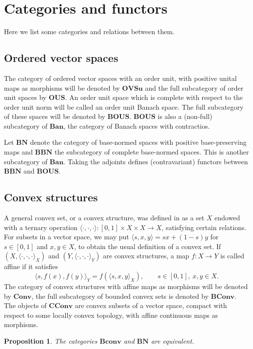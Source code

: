 \documentclass[12pt]{article}
\newtheorem{prop}{Proposition}
\newcommand{\<}{\langle}
\def\>{\rangle}
\newcommand{\ct}[1]{\mathbf{#1}}
\begin{document}
\section{Categories and functors}

Here we list some categories and relations between them. 

\subsection{Ordered vector spaces}

The category of ordered vector spaces with an order unit, with positive unital maps as morphisms will be denoted by $\ct{OVSu}$ and the full subcategory of order unit 
spaces by  $\ct{OUS}$. An order unit space which is complete with respect to the order unit norm will be called an order unit Banach space. The full subcategory of these spaces will be denoted by $\ct{BOUS}$. $\ct{BOUS}$ is also a (non-full) subcategory of $\ct{Ban}$, the category of Banach spaces with contractios.


Let $\ct{BN}$ denote the category of base-normed spaces with positive base-preserving maps and $\ct{BBN}$ the subcategory of complete base-normed spaces. 
 This is another subcategory of $\ct{Ban}$. Taking the adjoints defines  (contravariant) functors between  $\ct{BBN}$ and $\ct{BOUS}$. 

\subsection{Convex structures}

A general convex set, or a convex structure, was defined in \cite{gudder} as a set $X$ endowed with a ternary operation $\<\cdot,\cdot,\cdot\>: [0,1]\times X\times X\to X$,
 satisfying certain relations. For subsets in a vector space, we may put $\<s,x,y\>=sx+(1-s)y$ for $s\in [0,1]$ and $x,y\in X$, to obtain the usual definition of a convex set.  If $(X,\<\cdot,\cdot,\cdot\>_X)$ and $(Y,\<\cdot,\cdot,\cdot\>_Y)$ are convex structures, a map $f:X\to Y$ is called affine if it satisfies
\[
\<s,f(x),f(y)\>_Y=f(\<s,x,y\>_X),\qquad s\in [0,1],\ x,y\in X.
\]
The category of convex structures with affine maps as morphisms will be denoted by $\ct{Conv}$, the full subcategory of bounded convex sets is denoted by $\ct{BConv}$. The objects of $\ct{CConv}$ are convex subsets of a vector space,  compact with respect to some locally convex topology, with affine continuous maps as morphisms.

\begin{prop} The categories $\ct{Bconv}$ and $\ct{BN}$ are equivalent.

\end{prop}
\end{document}
